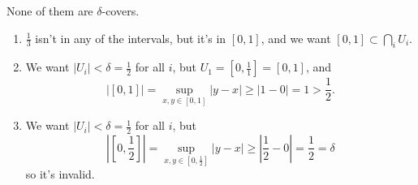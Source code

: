 None of them are \(\delta\)-covers.

\begin{enumerate}
    \item \(\frac{1}{3}\) isn't in any of the intervals, but it's in \([0,1]\), and we want \([0,1] \subset \bigcap_i U_i\).
    \item We want \(|U_i| < \delta = \frac{1}{2}\) for all \(i\), but \(U_1 = [0,\frac{1}{1}] = [0,1]\), and
    \[|[0,1]| = \sup_{x,y \in [0,1]} |y-x| \geq |1-0| = 1 > \frac{1}{2}.\]
    \item We want \(|U_i| < \delta = \frac{1}{2}\) for all \(i\), but
    \[|[0,\frac{1}{2}]| = \sup_{x,y \in [0,\frac{1}{2}]} |y-x| \geq \left|\frac{1}{2} - 0\right| = \frac{1}{2} = \delta\]
    so it's invalid.
\end{enumerate}